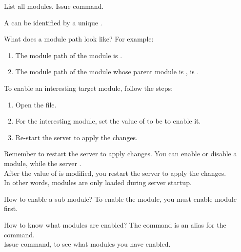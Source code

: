 \begin{tips}{List all modules.}
    Issue  command.
\end{tips}


A  can be identified by a unique .

\begin{example}{What does a module path look like?}
    For example:
    \begin{enumerate}
        \item {The module path of the module  is .}
        \item {The module path of the module  whose parent module is , is .}
    \end{enumerate}
\end{example}


To enable an interesting target module, follow the steps:
\begin{enumerate}
    \item {Open the \mainconfig file.}
    \item {For the interesting module, set the value of  to be  to enable it.}
    \item {Re-start the server to apply the changes.}
\end{enumerate}

\begin{warn}{Remember to restart the server to apply changes.}
    You can  enable or disable a module, while the server . \\
    After the value of  is modified, you  restart the server to apply the changes. \\
    In other words, modules are only loaded during server startup.
\end{warn}

\begin{tips}{How to enable a sub-module?}
    To enable the  module, you must enable  module first.
\end{tips}

\begin{tips}{How to know what modules are enabled?}
    The  command is an alias for the  command. \\
    Issue  command, to see what modules you have enabled.
\end{tips}


